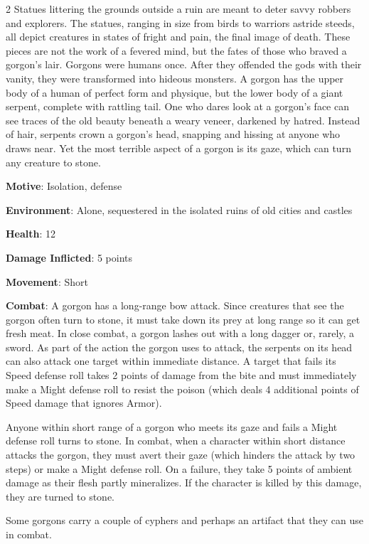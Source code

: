 \begin{multicols}{2}
Statues littering the grounds outside a ruin are meant to deter savvy robbers and explorers. The statues, ranging in size from birds to warriors astride steeds, all depict creatures in states of fright and pain, the final image of death. These pieces are not the work of a fevered mind, but the fates of those who braved a gorgon’s lair. Gorgons were humans once. After they offended the gods with their vanity, they were transformed into hideous monsters. A gorgon has the upper body of a human of perfect form and physique, but the lower body of a giant serpent, complete with rattling tail. One who dares look at a gorgon’s face can see traces of the old beauty beneath a weary veneer, darkened by hatred. Instead of hair, serpents crown a gorgon’s head, snapping and hissing at anyone who draws near. Yet the most terrible aspect of a gorgon is its gaze, which can turn any creature to stone. 

\textbf{Motive}: Isolation, defense 

\textbf{Environment}: Alone, sequestered in the isolated ruins of old cities and castles 

\textbf{Health}: 12 

\textbf{Damage Inflicted}: 5 points 

\textbf{Movement}: Short 

\textbf{Combat}: A gorgon has a long-range bow attack. Since creatures that see the gorgon often turn to stone, it must take down its prey at long range so it can get fresh meat. In close combat, a gorgon lashes out with a long dagger or, rarely, a sword. As part of the action the gorgon uses to attack, the serpents on its head can also attack one target within immediate distance. A target that fails its Speed defense roll takes 2 points of damage from the bite and must immediately make a Might defense roll to resist the poison (which deals 4 additional points of Speed damage that ignores Armor). 

Anyone within short range of a gorgon who meets its gaze and fails a Might defense roll turns to stone. In combat, when a character within short distance attacks the gorgon, they must avert their gaze (which hinders the attack by two steps) or make a Might defense roll. On a failure, they take 5 points of ambient damage as their flesh partly mineralizes. If the character is killed by this damage, they are turned to stone.

Some gorgons carry a couple of cyphers and perhaps an artifact that they can use in combat. 


\end{multicols}
